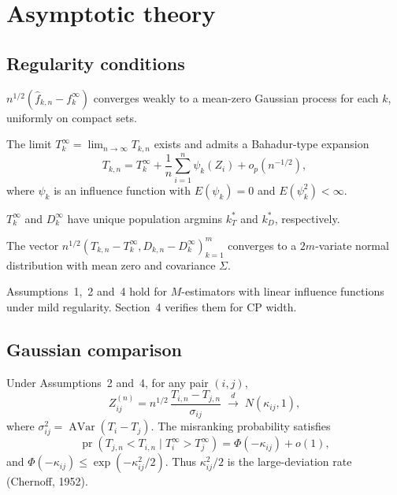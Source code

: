 \documentclass[lineno]{biometrika}
\DeclareMathOperator{\AVar}{AVar}
\DeclareMathOperator{\pr}{pr}
\begin{document}
\section{Asymptotic theory}

\subsection{Regularity conditions}

\begin{assumption}\label{assn:conv}
$n^{1/2}(\hat f_{k,n} - f_k^\infty)$ converges weakly to a mean-zero Gaussian process for each $k$, uniformly on compact sets.
\end{assumption}

\begin{assumption}\label{assn:bahadur}
The limit $T_k^\infty = \lim_{n\to\infty} T_{k,n}$ exists and admits a Bahadur-type expansion
\[
T_{k,n} = T_k^\infty + \frac1n\sum_{i=1}^n \psi_k(Z_i) + o_p(n^{-1/2}),
\]
where $\psi_k$ is an influence function with $E(\psi_k)=0$ and $E(\psi_k^2)<\infty$.
\end{assumption}

\begin{assumption}\label{assn:unique}
$T_k^\infty$ and $D_k^\infty$ have unique population argmins $k_T^*$ and $k_D^*$, respectively.
\end{assumption}

\begin{assumption}\label{assn:clt}
The vector $n^{1/2}(T_{k,n} - T_k^\infty, D_{k,n} - D_k^\infty)_{k=1}^m$ converges to a $2m$-variate normal distribution with mean zero and covariance $\Sigma$.
\end{assumption}

Assumptions~1,~2 and~4 hold for $M$-estimators with linear influence functions under mild regularity. Section~4 verifies them for CP width.

\subsection{Gaussian comparison}

\begin{proposition}\label{prop:gauss}
Under Assumptions~2 and~4, for any pair $(i,j)$,
\[
Z_{ij}^{(n)} = n^{1/2}\,\frac{T_{i,n} - T_{j,n}}{\sigma_{ij}} \;\xrightarrow{d}\; N(\kappa_{ij}, 1),
\]
where $\sigma_{ij}^2 = \AVar(T_i - T_j)$. The misranking probability satisfies
\[
\pr(T_{j,n} < T_{i,n} \mid T_i^\infty > T_j^\infty) = \Phi(-\kappa_{ij}) + o(1),
\]
and $\Phi(-\kappa_{ij}) \leq \exp(-\kappa_{ij}^2/2)$. Thus $\kappa_{ij}^2/2$ is the large-deviation rate (Chernoff, 1952).
\end{proposition}
\end{document}
